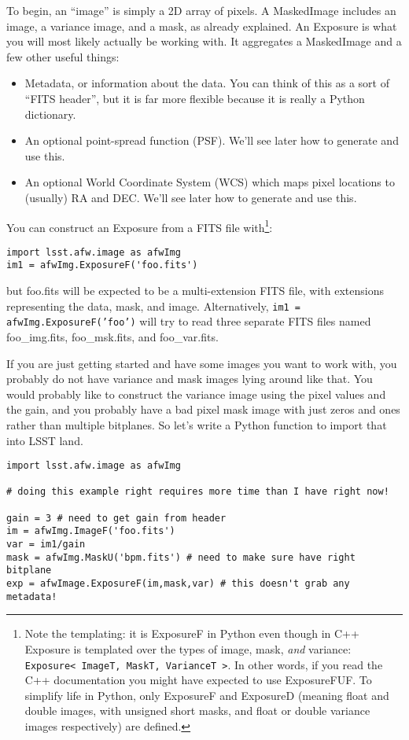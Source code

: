 To begin, an ``image'' is simply a 2D array of pixels. A MaskedImage
includes an image, a variance image, and a mask, as already explained.
An Exposure is what you will most likely actually be working with.  It
aggregates a MaskedImage and a few other useful things:
\begin{itemize}
\item Metadata, or information about the data.  You can think of this
  as a sort of ``FITS header'', but it is far more flexible because it
  is really a Python dictionary.
\item An optional point-spread function (PSF).  We'll see later how to
  generate and use this.
\item An optional World Coordinate System (WCS) which maps pixel
  locations to (usually) RA and DEC. We'll see later how to generate
  and use this.
\end{itemize}

You can construct an Exposure from a FITS file with\footnote{Note the
  templating: it is ExposureF in Python even though in C++ Exposure is
  templated over the types of image, mask, {\it and} variance:
  \texttt{Exposure< ImageT, MaskT, VarianceT >}.  In other words, if
  you read the C++ documentation you might have expected to use
  ExposureFUF.  To simplify life in Python, only ExposureF and
  ExposureD (meaning float and double images, with unsigned short
  masks, and float or double variance images respectively) are
  defined.}:
\begin{verbatim}
import lsst.afw.image as afwImg
im1 = afwImg.ExposureF('foo.fits')
\end{verbatim}
but foo.fits will be expected to be a multi-extension FITS file, with
extensions representing the data, mask, and image. Alternatively,
\texttt{im1 = afwImg.ExposureF('foo')} will try to read three separate
FITS files named foo\_img.fits, foo\_msk.fits, and foo\_var.fits.

If you are just getting started and have some images you want to work
with, you probably do not have variance and mask images lying around
like that.  You would probably like to construct the variance image
using the pixel values and the gain, and you probably have a bad pixel
mask image with just zeros and ones rather than multiple bitplanes.
So let's write a Python function to import that into LSST land.

\begin{verbatim}
import lsst.afw.image as afwImg

# doing this example right requires more time than I have right now!

gain = 3 # need to get gain from header
im = afwImg.ImageF('foo.fits')
var = im1/gain
mask = afwImg.MaskU('bpm.fits') # need to make sure have right bitplane
exp = afwImage.ExposureF(im,mask,var) # this doesn't grab any metadata!
\end{verbatim}

